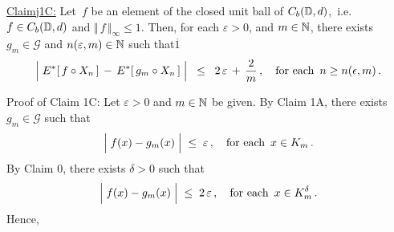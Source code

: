 \vskip 0.8cm
\begin{center}\begin{minipage}{6.5in}
\underline{Claim{{\color{white}j}}1C:}\;\;
Let \,$f$ be an element of the closed unit ball of $C_{b}(\mathbb{D},d)$,\,
i.e. $f \in C_{b}(\mathbb{D},d)$ and $\Vert\,f\,\Vert_{\infty} \leq 1$.
Then, for each $\varepsilon > 0$, and $m \in \mathbb{N}$,
there exists $g_{m} \in \mathcal{G}$ and $n(\varepsilon,m) \in \mathbb{N}$
such that{\color{white}$\overset{.}{1}$}
\begin{equation*}
\left\vert\; \overset{{\color{white}.}}{E^{*}}[\,f \circ X_{n}\,] \,-\, E^{*}[\,g_{m} \circ X_{n}\,] \;\right\vert
\;\; \leq \;\;
	2\,\varepsilon \,+\, \dfrac{2}{m}\,,
\quad
\textnormal{for each \,$n \geq n(\epsilon,m)$}\,.
\end{equation*}
\end{minipage}\end{center}
Proof of Claim 1C:\;\;
Let $\varepsilon > 0$ and $m \in \mathbb{N}$ be given. By Claim 1A,
there exists $g_{m} \in \mathcal{G}$ such that
\begin{equation*}
\left\vert\;f(x) \overset{{\color{white}.}}{-} g_{m}(x)\;\right\vert \;\leq\; \varepsilon\,,
\quad
\textnormal{for each \,$x \in K_{m}$}\,.
\end{equation*}
By Claim 0, there exists $\delta > 0$ such that
\begin{equation*}
\left\vert\;f(x) \overset{{\color{white}.}}{-} g_{m}(x)\;\right\vert \;\leq\; 2\,\varepsilon\,,
\quad
\textnormal{for each \,$x \in K_{m}^{\delta}$}\,.
\end{equation*}
Hence,
